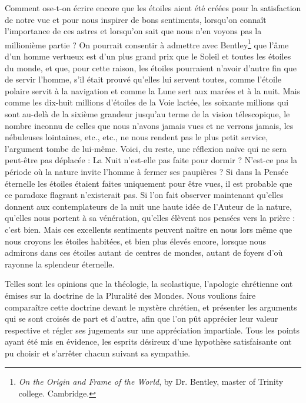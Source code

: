 \documentclass[a4paper, 11pt, oneside]{article}
\begin{document}
Comment ose-t-on écrire encore que les étoiles aient été créées pour la satisfaction de notre vue et pour nous inspirer de bons sentiments, lorsqu'on connaît l'importance de ces astres et lorsqu'on sait que nous n'en voyons pas la millionième partie ? On pourrait consentir à admettre avec Bentley\footnote{\emph{On the Origin and Frame of the World}, by Dr. Bentley, master of Trinity college. Cambridge.} que l'âme d'un homme vertueux est d'un plus grand prix que le Soleil et toutes les étoiles du monde, et que, pour cette raison, les étoiles pourraient n'avoir d'autre fin que de servir l'homme, s'il était prouvé qu'elles lui servent toutes, comme l'étoile polaire servit à la navigation et comme la Lune sert aux marées et à la nuit. Mais comme les dix-huit millions d'étoiles de la Voie lactée, les soixante millions qui sont au-delà de la sixième grandeur jusqu'au terme de la vision télescopique, le nombre inconnu de celles que nous n'avons jamais vues et ne verrons jamais, les nébuleuses lointaines, etc., etc., ne nous rendent pas le plus petit service, l'argument tombe de lui-même. Voici, du reste, une réflexion naïve qui ne sera peut-être pas déplacée : La Nuit n'est-elle pas faite pour dormir ? N'est-ce pas la période où la nature invite l'homme à fermer ses paupières ? Si dans la Pensée éternelle les étoiles étaient faites uniquement pour être vues, il est probable que ce paradoxe flagrant n'existerait pas. Si l'on fait observer maintenant qu'elles donnent aux contemplateurs de la nuit une haute idée de l'Auteur de la nature, qu'elles nous portent à sa vénération, qu'elles élèvent nos pensées vers la prière : c'est bien. Mais ces excellents sentiments peuvent naître en nous lors même que nous croyons les étoiles habitées, et bien plus élevés encore, lorsque nous admirons dans ces étoiles autant de centres de mondes, autant de foyers d'où rayonne la splendeur éternelle.

Telles sont les opinions que la théologie, la scolastique, l'apologie chrétienne ont émises sur la doctrine de la Pluralité des Mondes. Nous voulions faire comparaître cette doctrine devant le mystère chrétien, et présenter les arguments qui se sont croisés de part et d'autre, afin que l'on pût apprécier leur valeur respective et régler ses jugements sur une appréciation impartiale. Tous les points ayant été mis en évidence, les esprits désireux d'une hypothèse satisfaisante ont pu choisir et s'arrêter chacun suivant sa sympathie.
\end{document}
